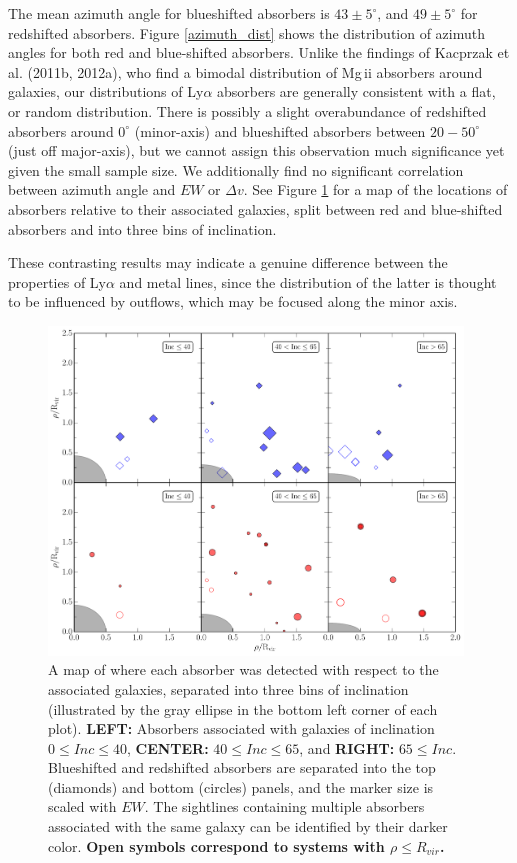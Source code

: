 \documentclass[twocolumn,tighten]{aastex6}
\begin{document}
The mean azimuth angle for blueshifted absorbers is $43\pm5^{\circ}$, and $49\pm5^{\circ}$ for redshifted absorbers. Figure \ref{azimuth_dist} shows the distribution of azimuth angles for both red and blue-shifted absorbers. Unlike the findings of Kacprzak et al. (2011b, 2012a), who find a bimodal distribution of Mg\,{\sc ii} absorbers around galaxies, our distributions of Ly$\alpha$ absorbers are generally consistent with a flat, or random distribution. There is possibly a slight overabundance of redshifted absorbers around $0^{\circ}$ (minor-axis) and blueshifted absorbers between $20-50^{\circ}$ (just off major-axis), but we cannot assign this observation much significance yet given the small sample size. We additionally find no significant correlation between azimuth angle and $EW$ or $\Delta v$. See Figure \ref{azimuthMap} for a map of the locations of absorbers relative to their associated galaxies, split between red and blue-shifted absorbers and into three bins of inclination.

These contrasting results may indicate a genuine difference between the properties of Ly$\alpha$ and metal lines, since the distribution of the latter is thought to be influenced by outflows, which may be focused along the minor axis.


\begin{figure}[ht!]
        \centering
        \includegraphics[width=0.98\textwidth]{fig13.pdf}
        \caption{\small{A map of where each absorber was detected with respect to the associated galaxies, separated into three bins of inclination (illustrated by the gray ellipse in the bottom left corner of each plot). \textbf{LEFT:} Absorbers associated with galaxies of inclination $0 \leq Inc \le 40$, \textbf{CENTER:} $40 \leq Inc \le 65$, and \textbf{RIGHT: } $65 \leq Inc$. Blueshifted and redshifted absorbers are separated into the top (diamonds) and bottom (circles) panels, and the marker size is scaled with $EW$. The sightlines containing multiple absorbers associated with the same galaxy can be identified by their darker color. \textbf{Open symbols correspond to systems with $\rho \leq R_{vir}$.}}}
        \label{azimuthMap}
\end{figure} 
\end{document}
